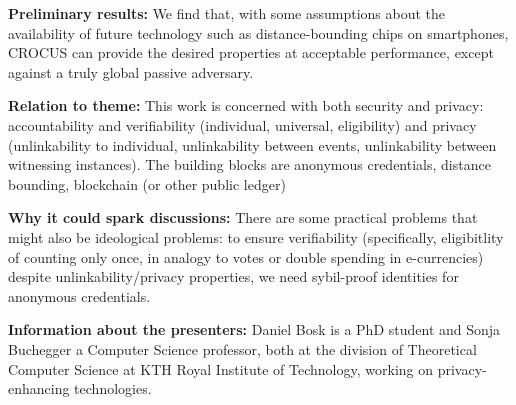 \textbf{Preliminary results:} We find that, with some
assumptions about the availability of future technology such as
distance-bounding chips on smartphones, CROCUS can provide the
desired properties at acceptable performance, except against a truly
global passive adversary.

\textbf{Relation to theme:} This work is concerned with both security
and privacy: accountability and verifiability (individual, universal, eligibility) and
privacy (unlinkability to individual, unlinkability between events,
unlinkability between witnessing instances). The building blocks are
anonymous credentials, distance bounding, blockchain (or other public ledger)


\textbf{Why it could spark discussions:} There are some practical
problems that might also be ideological problems: to ensure
verifiability (specifically, eligibitlity of counting only once, in
analogy to votes or double spending in e-currencies) despite
unlinkability/privacy properties, we need sybil-proof identities for
anonymous credentials.

\textbf{Information about the presenters:} Daniel Bosk is a PhD
student and Sonja Buchegger a Computer Science professor, both at the
division of Theoretical Computer Science at KTH Royal Institute of
Technology, working on privacy-enhancing technologies.
